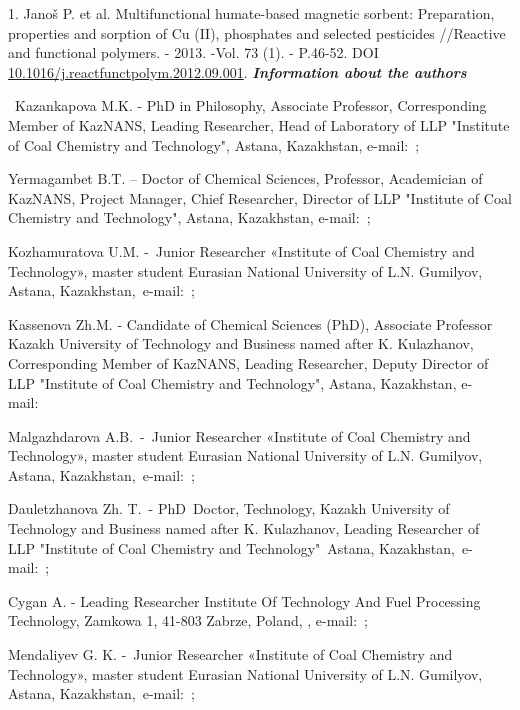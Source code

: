 1. Janoš P. et al. Multifunctional humate-based magnetic sorbent:
Preparation, properties and sorption of Cu (II), phosphates and
selected pesticides //Reactive and functional polymers. - 2013. -Vol.
73 (1). - P.46-52. DOI
\href{https://doi.org/10.1016/j.reactfunctpolym.2012.09.001}{10.1016/j.reactfunctpolym.2012.09.001}.
\emph{{\bfseries Information about the authors}}

~Kazankapova M.K. - PhD in Philosophy, Associate Professor,
Corresponding Member of KazNANS, Leading Researcher, Head of Laboratory
of LLP "Institute of Coal Chemistry and Technology", Astana, Kazakhstan,
e-mail:~\href{https://e.mail.ru/compose/?mailto=mailto\%3amaira_1986@mail.ru}{};

Yermagambet B.T. -- Doctor of Chemical Sciences, Professor, Academician
of KazNANS, Project Manager, Chief Researcher, Director of LLP
"Institute of Coal Chemistry and Technology", Astana, Kazakhstan,
e-mail:~\href{https://e.mail.ru/compose/?mailto=mailto\%3abake.yer@mail.ru}{};

Kozhamuratova U.M. -~Junior Researcher «Institute of Coal Chemistry and
Technology», master student Eurasian National University of L.N.
Gumilyov, Astana,
Kazakhstan,~e-mail:~\href{https://e.mail.ru/compose/?mailto=mailto\%3akozhamuratova.u@mail.ru}{};

Kassenova Zh.M. - Candidate of Chemical Sciences (PhD), Associate
Professor Kazakh University of Technology and Business named after K.
Kulazhanov, Corresponding Member of KazNANS, Leading Researcher, Deputy
Director of LLP "Institute of Coal Chemistry and Technology", Astana,
Kazakhstan,
e-mail:~~

Malgazhdarova A.B.~-~Junior Researcher «Institute of Coal Chemistry and
Technology», master student Eurasian National University of L.N.
Gumilyov, Astana,
Kazakhstan,~e-mail:~\href{https://e.mail.ru/compose/?mailto=mailto\%3amalgazhdarova.ab@mail.ru}{};

Dauletzhanova Zh. T.~- PhD~Doctor, Technology, Kazakh University of
Technology and Business named after K. Kulazhanov, Leading Researcher
of~ LLP "Institute of Coal Chemistry and Technology"~Astana,
Kazakhstan,~e-mail:~\href{https://e.mail.ru/compose/?mailto=mailto\%3akaliyeva_zhanna@mail.ru}{};

Cygan A. - Leading Researcher Institute Of Technology And Fuel
Processing Technology, Zamkowa 1, 41-803 Zabrze, Poland, ,
e-mail:~\href{mailto:acygan@itpe.pl}{};

Mendaliyev G. K. -~Junior Researcher «Institute of Coal Chemistry and
Technology», master student Eurasian National University of L.N.
Gumilyov, Astana,
Kazakhstan,~e-mail:~\href{https://e.mail.ru/compose/?mailto=mailto\%3aganimen02@mail.ru}{};

